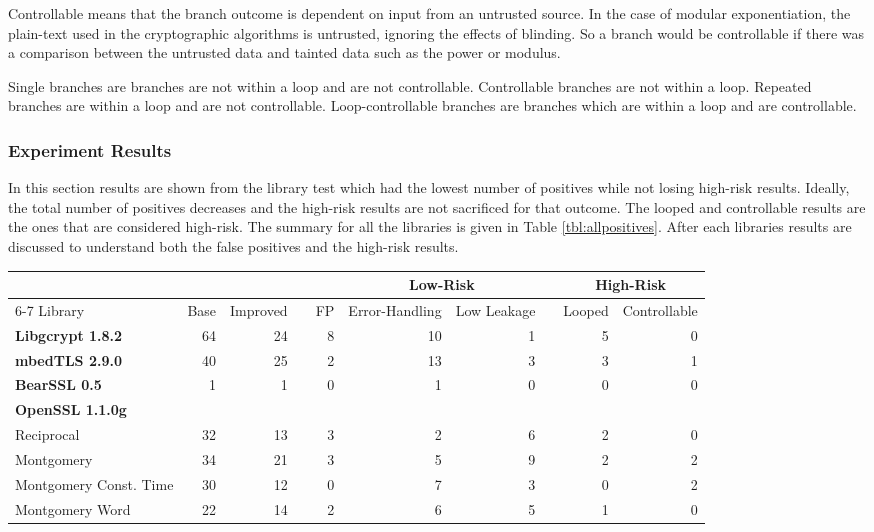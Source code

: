 Controllable means that the branch outcome is dependent on input from an
 untrusted source. In the case of modular exponentiation, the plain-text used in
 the cryptographic algorithms is untrusted, ignoring the effects of blinding. So
 a branch would be controllable if there was a comparison between the untrusted
 data and tainted data such as the power or modulus.

 Single branches are branches are not within a loop and are not controllable.
 Controllable branches are not within a loop. Repeated branches are within a
 loop and are not controllable. Loop-controllable branches are branches which
 are within a loop and are controllable.

\subsubsection{Experiment Results}

    In this section results are shown from the library test which had the lowest
    number of positives while not losing high-risk results. Ideally, the total
    number of positives decreases and the high-risk results are not sacrificed
    for that outcome. The looped and controllable results are the ones that are
    considered high-risk. The summary for all the libraries is given in Table
    \ref{tbl:allpositives}. After each libraries results are discussed to
    understand both the false positives and the high-risk results.

\begin{table*}[!t]
  \centering
  \begin{tabular}{@{}lrr|crrrcrr@{}}
    \toprule
    &  &  &&  & \multicolumn{2}{c}{Low-Risk} && \multicolumn{2}{c}{High-Risk}\\
    \cmidrule{6-7} \cmidrule{9-10}
    Library& Base & Improved&& FP& Error-Handling & Low Leakage && Looped & Controllable \\
    \midrule
    \textbf{Libgcrypt 1.8.2}& 64 & 24 &&8 & 10 & 1 && 5 & 0\\
    \textbf{mbedTLS 2.9.0}  & 40 & 25 &&2 & 13 & 3 && 3  & 1\\
    \textbf{BearSSL 0.5}    & 1 & 1   &&0 & 1 & 0  && 0  & 0\\
    \textbf{OpenSSL 1.1.0g}\\
    \hspace{0.25cm}Reciprocal              & 32 & 13 && 3    & 2   & 6 && 2 & 0\\
    \hspace{0.25cm}Montgomery              & 34 & 21 &&  3   &  5  & 9 && 2  & 2\\
    \hspace{0.25cm}Montgomery Const. Time  & 30 & 12 &&  0   &  7  & 3 && 0   & 2\\
    \hspace{0.25cm}Montgomery Word         & 22 & 14 &&  2   & 6   & 5 && 1   & 0\\
    \bottomrule
  \end{tabular}
\caption{Result Classifications: Base - Baseline Positives, Improved - WL/FS/SRC
Positives}
  \label{tbl:allpositives}
\end{table*}


